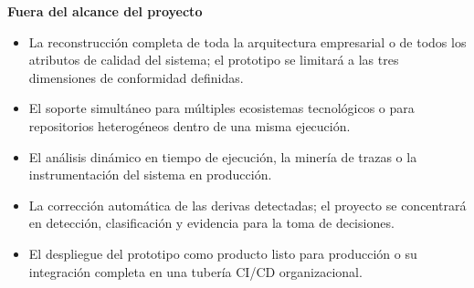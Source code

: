 \noindent\textbf{Fuera del alcance del proyecto}

\begin{itemize}[label=*]
  \item La reconstrucción completa de toda la arquitectura empresarial o de todos los atributos de calidad del sistema; el prototipo se limitará a las tres dimensiones de conformidad definidas.
  \item El soporte simultáneo para múltiples ecosistemas tecnológicos o para repositorios heterogéneos dentro de una misma ejecución.
  \item El análisis dinámico en tiempo de ejecución, la minería de trazas o la instrumentación del sistema en producción.
  \item La corrección automática de las derivas detectadas; el proyecto se concentrará en detección, clasificación y evidencia para la toma de decisiones.
  \item El despliegue del prototipo como producto listo para producción o su integración completa en una tubería CI/CD organizacional.
\end{itemize}